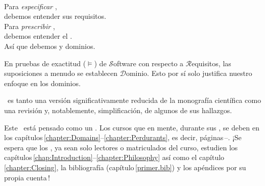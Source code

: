 \label{chap:Introduction}\label{chap:Introduction.1}
\minitoc

\begin{flushright}\label{intro:The Triptych Dogma}
\\[4mm]
\sf Para \textsl{especificar} ,\\
\sf debemos entender sus requisitos.\\[1mm]
\sf Para \textsl{prescribir} ,\\
\sf debemos entender el .\\[1mm]
\sf Así que debemos  y  dominios.\\
\end{flushright}\rm%
\mnewfoil

\noindent
\begynd
\pind En pruebas de exactitud ($\models$)
\begynd
\pind de $\mathcal{S}$oftware
\pind con respecto a $\mathcal{R}$equisitos,
\pind las suposiciones a menudo se establecen  $\mathcal{D}$ominio.
\afslut
\pind Esto por sí solo justifica nuestro enfoque en los dominios.
\afslut
\endboiteepaisseavecuntitre

\mnewfoil

\noindent
\begynd
\pind {} \manual\ es
\begynd
\pind tanto una versión significativamente reducida \nyl de la monografía científica \cite{BjornerMonograph2020} 
\pind como una revisión y, notablemente, simplificación, de algunos de sus hallazgos.
\afslut
\afslut

\label{sec:Why This Primer}

\begynd
\pind Este \manual\ está pensado como un .
\pind Los cursos que  en mente, durante sus , se deben  en los
      capítulos\,\ref{chapter:Domains}--\ref{chapter:Perdurants},
      es decir, páginas\,\pageref{chapter:Domains}--\pageref{chapter:Perdurants.n}.
\pind ¡Se espera que los , ya sean solo lectores o matriculados del curso, estudien
      los capítulos\,\ref{chap:Introduction}--\ref{chapter:Philosophy} así
      como el capítulo\,\ref{chapter:Closing}, la bibliografía
      (capítulo\,\ref{primer.bib}) y los apéndices por su propia cuenta\,!
\afslut

